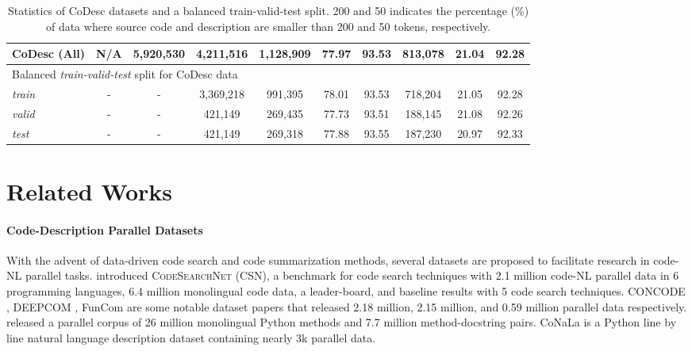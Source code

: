 \documentclass[11pt,a4paper]{article}
\begin{document}
\begin{table*}
{\begin{tabular}{l|c|c|c|c|c|c|c|c|c}
CoDesc (All) & N/A & 5,920,530 & 4,211,516 & 1,128,909 & 77.97 & 93.53 & 813,078 & 21.04 & 92.28 \\
\hline
\multicolumn{10}{l}{Balanced \textit{train-valid-test} split for CoDesc data} \\
\hline
\textit{train} & \multicolumn{1}{c|}{-} & \multicolumn{1}{c|}{-} & 3,369,218 & 991,395 & 78.01 & 93.53 & 718,204 & 21.05 & 92.28 \\
\textit{valid} & \multicolumn{1}{c|}{-} & \multicolumn{1}{c|}{-} & 421,149 & 269,435 & 77.73 & 93.51 & 188,145 & 21.08 & 92.26 \\
\textit{test} & \multicolumn{1}{c|}{-} & \multicolumn{1}{c|}{-} & 421,149 & 269,318 & 77.88 & 93.55  & 187,230 & 20.97 & 92.33 \\
\hline 
\end{tabular}
}
\caption{Statistics of CoDesc datasets and a balanced train-valid-test split. 200 and 50 indicates the percentage (\%) of data where source code and description are smaller than 200 and 50 tokens, respectively.}
\label{tab:data-description}
\end{table*}
 
\section{Related Works}
\label{sec:related-works}
\paragraph{Code-Description Parallel Datasets}




With the advent of data-driven code search and code summarization methods, several datasets are proposed to facilitate research in code-NL parallel tasks.
\citet{husain2019codesearchnet} introduced \textsc{CodeSearchNet (CSN)}, a benchmark for code search techniques with 2.1 million code-NL parallel data in 6 programming languages, 6.4 million monolingual code data, a leader-board, and baseline results with 5 code search techniques. CONCODE \cite{concode}, DEEPCOM \cite{deepcom}, FunCom \cite{funcom} are some notable dataset papers that released 2.18 million, 2.15 million, and 0.59 million parallel data respectively. \citet{pymt5} released a parallel corpus of 26 million monolingual Python methods and 7.7 million method-docstring pairs. CoNaLa \cite{conala} is a Python line by line natural language description dataset containing nearly 3k parallel data.
\end{document}
